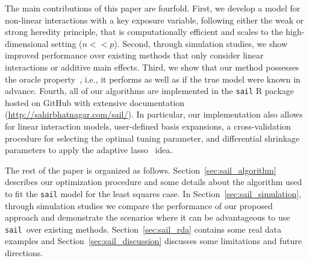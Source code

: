 \documentclass[12pt,letter]{article}\usepackage[]{graphicx}\usepackage[]{color}
\newcommand{\xmark}{\ding{55}}%
\newcommand{\sail}{\texttt{sail}}
\begin{document}
The main contributions of this paper are fourfold. 
First, we develop a model for non-linear interactions with a key exposure variable, following either the weak or strong heredity principle, that is computationally efficient and scales to the high-dimensional setting ($n << p$). 
Second, through simulation studies, we show improved performance over existing methods that only consider linear interactions or additive main effects. 
Third, we show that our method possesses the oracle property~\citep{fan2001variable}, i.e., it performs as well as if the true model were known in advance. 
Fourth, all of our algorithms are implemented in the \texttt{sail} R package hosted on GitHub with extensive documentation (\url{http://sahirbhatnagar.com/sail/}). In particular, our implementation also allows for linear interaction models, user-defined basis expansions, a cross-validation procedure for selecting the optimal tuning parameter, and differential shrinkage parameters to apply the adaptive lasso~\citep{zou2006adaptive} idea. 

The rest of the paper is organized as follows. Section~\ref{sec:sail_algorithm} describes our optimization procedure and some details about the algorithm used to fit the \texttt{sail} model for the least squares case. In Section~\ref{sec:sail_simulation}, through simulation studies we compare the performance of our proposed approach and demonstrate the scenarios where it can be advantageous to use \sail ~over existing methods. Section~\ref{sec:sail_rda} contains some real data examples and Section~\ref{sec:sail_discussion} discusses some limitations and future directions. 

\begin{comment}
\ctable[pos=H,doinside=\footnotesize]{lcc}{
}{
\FL
Type      & Method   & Software \ML
\multicolumn{1}{m{1cm}}{Linear}    & \multicolumn{1}{m{6cm}}{\texttt{CAP}~\citep{zhao2009composite} }        &   \xmark    \\
& \multicolumn{1}{m{4cm}}{\texttt{SHIM}~\citep{choi2010variable}}        &   \xmark    \\
& \multicolumn{1}{m{4cm}}{\texttt{hiernet}~\citep{bien2013lasso}}        &   \texttt{hierNet(x, y)}    \\
& \multicolumn{1}{m{4cm}}{\texttt{GRESH}~\citep{she2014group} }        &  \xmark     \\
& \multicolumn{1}{m{4cm}}{\texttt{FAMILY}~\citep{haris2016convex}}    &  \texttt{FAMILY(x, z, y)}   \\
& \multicolumn{1}{m{4cm}}{\texttt{glinternet}~\citep{lim2015learning} }    & \texttt{glinternet(x, y)}  \\			   	 	
& \multicolumn{1}{m{4cm}}{\texttt{RAMP}~\citep{hao2018model}}        & \texttt{RAMP(x, y)}  \\ 
& \multicolumn{1}{m{4cm}}{\texttt{LassoBacktracking}~\citep{shah2016modelling}   }        & \texttt{LassoBT(x, y)}  \ML
\multicolumn{1}{m{4cm}}{Non-linear} 	& \multicolumn{1}{m{8cm}}{\texttt{VANISH}~\citep{radchenko2010variable} }        & \xmark  \\
& \multicolumn{1}{m{4cm}}{\texttt{sail}}        & \texttt{sail(x, y, e)}  \LL
}

\end{comment}
\end{document}
